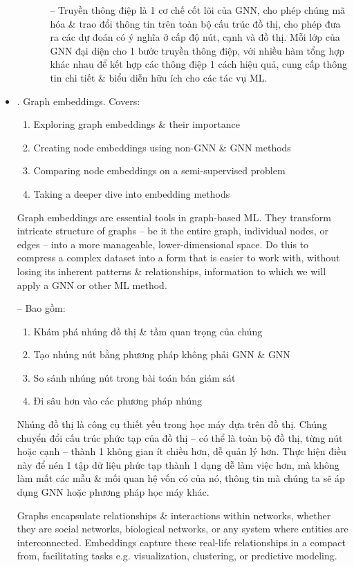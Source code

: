 \documentclass{article}
\begin{document}
\begin{itemize}
\begin{itemize}
\begin{itemize}
            -- Truyền thông điệp là 1 cơ chế cốt lõi của GNN, cho phép chúng mã hóa \& trao đổi thông tin trên toàn bộ cấu trúc đồ thị, cho phép đưa ra các dự đoán có ý nghĩa ở cấp độ nút, cạnh và đồ thị. Mỗi lớp của GNN đại diện cho 1 bước truyền thông điệp, với nhiều hàm tổng hợp khác nhau để kết hợp các thông điệp 1 cách hiệu quả, cung cấp thông tin chi tiết \& biểu diễn hữu ích cho các tác vụ ML.
        \end{itemize}
    \end{itemize}
    \item {. Graph embeddings.} Covers:
    \begin{enumerate}
        \item Exploring graph embeddings \& their importance
        \item Creating node embeddings using non-GNN \& GNN methods
        \item Comparing node embeddings on a semi-supervised problem
        \item Taking a deeper dive into embedding methods
    \end{enumerate}
    Graph embeddings are essential tools in graph-based ML. They transform intricate structure of graphs -- be it the entire graph, individual nodes, or edges -- into a more manageable, lower-dimensional space. Do this to compress a complex dataset into a form that is easier to work with, without losing its inherent patterns \& relationships, information to which we will apply a GNN or other ML method.

    -- Bao gồm:
    \begin{enumerate}
        \item Khám phá nhúng đồ thị \& tầm quan trọng của chúng
        \item Tạo nhúng nút bằng phương pháp không phải GNN \& GNN
        \item So sánh nhúng nút trong bài toán bán giám sát
        \item Đi sâu hơn vào các phương pháp nhúng
    \end{enumerate}
    Nhúng đồ thị là công cụ thiết yếu trong học máy dựa trên đồ thị. Chúng chuyển đổi cấu trúc phức tạp của đồ thị -- có thể là toàn bộ đồ thị, từng nút hoặc cạnh -- thành 1 không gian ít chiều hơn, dễ quản lý hơn. Thực hiện điều này để nén 1 tập dữ liệu phức tạp thành 1 dạng dễ làm việc hơn, mà không làm mất các mẫu \& mối quan hệ vốn có của nó, thông tin mà chúng ta sẽ áp dụng GNN hoặc phương pháp học máy khác.

    Graphs encapsulate relationships \& interactions within networks, whether they are social networks, biological networks, or any system where entities are interconnected. Embeddings capture these real-life relationships in a compact from, facilitating tasks e.g. visualization, clustering, or predictive modeling.


\end{itemize}
\end{document}
